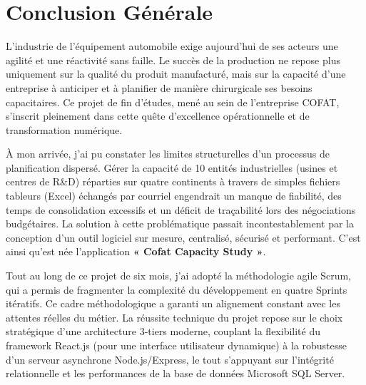 \chapter*{Conclusion Générale}

L'industrie de l'équipement automobile exige aujourd'hui de ses acteurs une agilité et une réactivité sans faille. Le succès de la production ne repose plus uniquement sur la qualité du produit manufacturé, mais sur la capacité d'une entreprise à anticiper et à planifier de manière chirurgicale ses besoins capacitaires. Ce projet de fin d'études, mené au sein de l'entreprise COFAT, s'inscrit pleinement dans cette quête d'excellence opérationnelle et de transformation numérique. 

À mon arrivée, j'ai pu constater les limites structurelles d'un processus de planification dispersé. Gérer la capacité de 10 entités industrielles (usines et centres de R\&D) réparties sur quatre continents à travers de simples fichiers tableurs (Excel) échangés par courriel engendrait un manque de fiabilité, des temps de consolidation excessifs et un déficit de traçabilité lors des négociations budgétaires. La solution à cette problématique passait incontestablement par la conception d'un outil logiciel sur mesure, centralisé, sécurisé et performant. C'est ainsi qu'est née l'application \textbf{« Cofat Capacity Study »}.

Tout au long de ce projet de six mois, j'ai adopté la méthodologie agile Scrum, qui a permis de fragmenter la complexité du développement en quatre Sprints itératifs. Ce cadre méthodologique a garanti un alignement constant avec les attentes réelles du métier. La réussite technique du projet repose sur le choix stratégique d'une architecture 3-tiers moderne, couplant la flexibilité du framework React.js (pour une interface utilisateur dynamique) à la robustesse d'un serveur asynchrone Node.js/Express, le tout s'appuyant sur l'intégrité relationnelle et les performances de la base de données Microsoft SQL Server.

